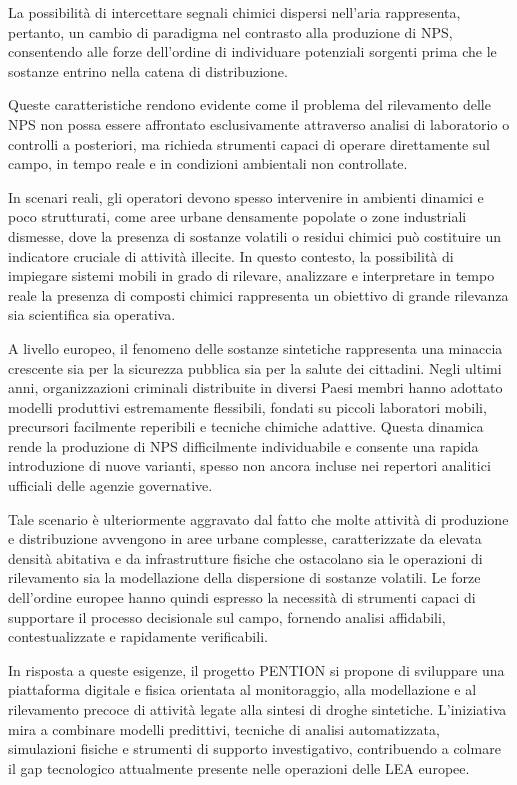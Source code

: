 La possibilità di intercettare segnali chimici dispersi nell’aria rappresenta, pertanto, un cambio di paradigma nel contrasto alla produzione di NPS, consentendo alle forze dell’ordine di individuare potenziali sorgenti prima che le sostanze entrino nella catena di distribuzione.

Queste caratteristiche rendono evidente come il problema del rilevamento delle NPS non possa essere affrontato esclusivamente attraverso analisi di laboratorio o controlli a posteriori, ma richieda strumenti capaci di operare direttamente sul campo, in tempo reale e in condizioni ambientali non controllate.

In scenari reali, gli operatori devono spesso intervenire in ambienti dinamici e poco strutturati, come aree urbane densamente popolate o zone industriali dismesse, dove la presenza di sostanze volatili o residui chimici può costituire un indicatore cruciale di attività illecite.
In questo contesto, la possibilità di impiegare sistemi mobili in grado di rilevare, analizzare e interpretare in tempo reale la presenza di composti chimici rappresenta un obiettivo di grande rilevanza sia scientifica sia operativa.

A livello europeo, il fenomeno delle sostanze sintetiche rappresenta una minaccia crescente sia per la sicurezza pubblica sia per la salute dei cittadini. Negli ultimi anni, organizzazioni criminali distribuite in diversi Paesi membri hanno adottato modelli produttivi estremamente flessibili, fondati su piccoli laboratori mobili, precursori facilmente reperibili e tecniche chimiche adattive. Questa dinamica rende la produzione di NPS difficilmente individuabile e consente una rapida introduzione di nuove varianti, spesso non ancora incluse nei repertori analitici ufficiali delle agenzie governative.

Tale scenario è ulteriormente aggravato dal fatto che molte attività di produzione e distribuzione avvengono in aree urbane complesse, caratterizzate da elevata densità abitativa e da infrastrutture fisiche che ostacolano sia le operazioni di rilevamento sia la modellazione della dispersione di sostanze volatili. Le forze dell’ordine europee hanno quindi espresso la necessità di strumenti capaci di supportare il processo decisionale sul campo, fornendo analisi affidabili, contestualizzate e rapidamente verificabili.

In risposta a queste esigenze, il progetto \textsc{PENTION} si propone di sviluppare una piattaforma digitale e fisica orientata al monitoraggio, alla modellazione e al rilevamento precoce di attività legate alla sintesi di droghe sintetiche. L’iniziativa mira a combinare modelli predittivi, tecniche di analisi automatizzata, simulazioni fisiche e strumenti di supporto investigativo, contribuendo a colmare il gap tecnologico attualmente presente nelle operazioni delle LEA europee.

